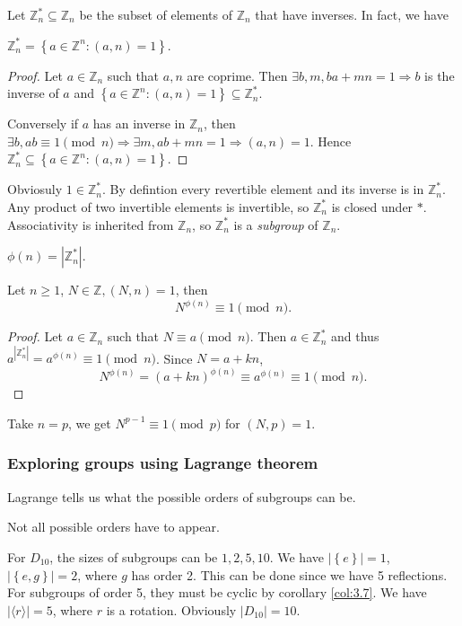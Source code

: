 \documentclass[a4paper]{article}
\begin{document}
Let $ \mathbb{Z}_n^* \subseteq \mathbb{Z}_n $ be the subset of
elements of $\mathbb{Z}_n$ that have inverses. In fact, we have
\begin{proposition}
  $ \mathbb{Z}_n^*=\left\{ a\in \mathbb{Z}^n: (a,n)=1\right\} $.
\end{proposition}
\begin{proof}
  Let $a\in \mathbb{Z}_n$ such that $a,n$ are coprime. Then $ \exists
  b,m, ba+mn=1 \Rightarrow b$ is the inverse of $a$ and $ \left\{
  a\in \mathbb{Z}^n: (a,n)=1\right\} \subseteq \mathbb{Z}_n^* $.

  Conversely if $a$ has an inverse in $ \mathbb{Z}_n $, then $
  \exists b, ab \equiv 1\pmod n \Rightarrow \exists m, ab+mn=1
  \Rightarrow (a,n)=1$. Hence $\mathbb{Z}_n^* \subseteq \left\{ a\in
  \mathbb{Z}^n: (a,n)=1\right\}$.
\end{proof}
Obviosuly $1\in \mathbb{Z}_n^*$. By defintion every revertible
element and its inverse is in $\mathbb{Z}_n^*$. Any product of two
invertible elements is invertible, so $\mathbb{Z}_n^*$ is closed
under $*$. Associativity is inherited from $ \mathbb{Z}_n $, so
$\mathbb{Z}_n^*$ is a \textit{subgroup} of $ \mathbb{Z}_n $.
\begin{definition}
  $ \phi(n)=|\mathbb{Z}_n^*| $.
\end{definition}
\begin{theorem}\label{thm:fermat-euler}
  Let $n\ge 1$, $N\in \mathbb{Z}, (N,n)=1$, then
  \[
    N^{\phi(n)}\equiv 1\pmod n
  .\]
\end{theorem}
\begin{proof}
  Let $ a\in \mathbb{Z}_n $ such that $ N \equiv a \pmod{n} $. Then
  $a\in \mathbb{Z}_n^*$ and thus $ a^{|\mathbb{Z}_n^*|}=a^{\phi(n)}
  \equiv 1 \pmod{n} $. Since $ N=a+kn $,
  \[
    N^{\phi(n)}=(a+kn)^{\phi(n)} \equiv a^{\phi(n)}  \equiv 1 \pmod{n}.
  \]
\end{proof}
Take $n=p$, we get $ N^{p-1}\equiv 1\pmod{p} $ for $ (N,p)=1 $.
\subsubsection{Exploring groups using Lagrange theorem}
Lagrange tells us what the possible orders of subgroups can be.
\begin{remark}
  Not all possible orders have to appear.
\end{remark}
\begin{example}
  For $D_{10}$, the sizes of subgroups can be $ 1,2,5,10 $. We have $
  |\left\{ e\right\}|=1 $, $ |\left\{ e,g\right\}|=2 $, where $g$ has
  order 2. This can be done since we have 5 reflections. For
  subgroups of order 5, they must be cyclic by corollary
  \ref{col:3.7}. We have $ |\langle r \rangle |=5 $, where $r$ is a
  rotation. Obviously $ |D_{10}|=10 $.
\end{example}
\end{document}
